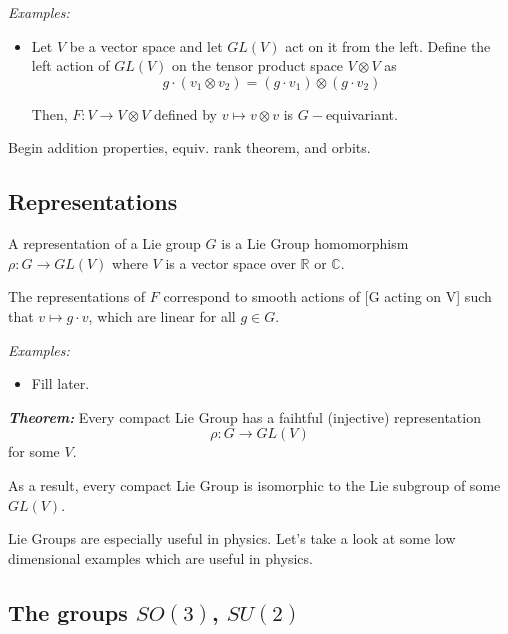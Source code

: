 \documentclass{article}
\newcommand{\R}{\mathbb{R}}
\newcommand{\C}{\mathbb{C}}
\begin{document}
\vskip 0.5cm
\emph{Examples:}
\begin{itemize}
  \item Let $V$ be a vector space and let $GL(V)$ act on it from the left. Define the left action of $GL(V)$ on the tensor product space $V \otimes V$ as 
  \[ g \cdot \left( v_1 \otimes v_2 \right) = \left(g \cdot v_1\right) \otimes \left(g \cdot v_2\right) \]

  Then, $F: V \rightarrow V \otimes V$ defined by $v \mapsto v \otimes v$ is $G-$equivariant.
\end{itemize}

\begin{dottedbox}
  Begin addition properties, equiv. rank theorem, and orbits.
\end{dottedbox}

\vskip 1cm
\subsection{Representations}

\begin{mathdefinitionbox}{}
  A representation of a Lie group $G$ is a Lie Group homomorphism $\rho : G \rightarrow GL(V)$ where $V$ is a vector space over $\R$ or $\C$.  
\end{mathdefinitionbox}

The representations of $F$ correspond to smooth actions of [G acting on V] such that $v \mapsto g \cdot v$, which are linear for all $g \in G$.

\vskip 0.25cm
\emph{Examples:}
\begin{itemize}
  \item Fill later.
\end{itemize}

\vskip 0.5cm
\begin{dottedbox}
  \emph{\textbf{Theorem:}} Every compact Lie Group has a faihtful (injective) representation
  \[ \rho : G \rightarrow GL(V) \]
  for some $V$.

  \vskip 0.5cm
  As a result, every compact Lie Group is isomorphic to the Lie subgroup of some $GL(V)$.
\end{dottedbox}

\vskip 0.5cm
Lie Groups are especially useful in physics. Let's take a look at some low dimensional examples which are useful in physics.

\vskip 1cm
\subsection{The groups $SO(3)$, $SU(2)$}
\end{document}
